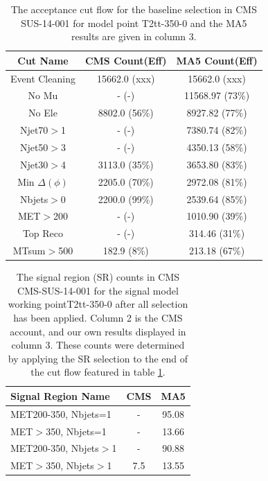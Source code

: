 \begin{table}
    \begin{centering}
    \begin{tabular}{  c | c | c  }
    \hline
    Cut Name & CMS Count(Eff) & MA5 Count(Eff)\\
    \hline
        Event Cleaning & 15662.0 (xxx) & 15662.0 (xxx)\\
    No Mu & - (-) & 11568.97 (73\%)\\
    No Ele & 8802.0 (56\%) & 8927.82 (77\%)\\
    Njet70$>$1 & - (-) & 7380.74 (82\%)\\
    Njet50$>$3 & - (-) & 4350.13 (58\%)\\
    Njet30$>$4 & 3113.0 (35\%) & 3653.80 (83\%)\\
    Min $\Delta(\phi)$ & 2205.0 (70\%) & 2972.08 (81\%)\\
    Nbjets$>$0 & 2200.0 (99\%) & 2539.64 (85\%)\\
    MET$>$200 & - (-) & 1010.90 (39\%)\\
    Top Reco & - (-) & 314.46 (31\%)\\
    MTsum$>$500 & 182.9 (8\%) & 213.18 (67\%)\\
\hline
    \end{tabular}
    \caption{The acceptance cut flow for the baseline selection in CMS SUS-14-001 for
    model point T2tt-350-0 and the MA5 results are given in column 3.}
    \label{table:T2tt-350-0}
    \end{centering}
    \end{table}

    \begin{table}
    \begin{centering}
    \begin{tabular}{  l | c | c  }
    \hline
    Signal Region Name & CMS & MA5\\
    \hline
    MET200-350,  Nbjets=1 & - & 95.08\\ 
 \hline 
MET$>$350,  Nbjets=1 & - & 13.66\\ 
 \hline 
MET200-350,  Nbjets$>$1 & - & 90.88\\ 
 \hline 
MET$>$350,  Nbjets$>$1 & 7.5 & 13.55\\ 
 \hline 
\hline
    \end{tabular}
    \caption{The signal region (SR) counts in CMS CMS-SUS-14-001 for
    the signal model working pointT2tt-350-0 after all selection has been applied. Column 2 is the CMS account,
    and our own results displayed in column 3. These counts were determined by applying the SR selection to the end of the cut flow featured in table \ref{table:T2tt-350-0}.}
    \end{centering}
    \end{table}
    
